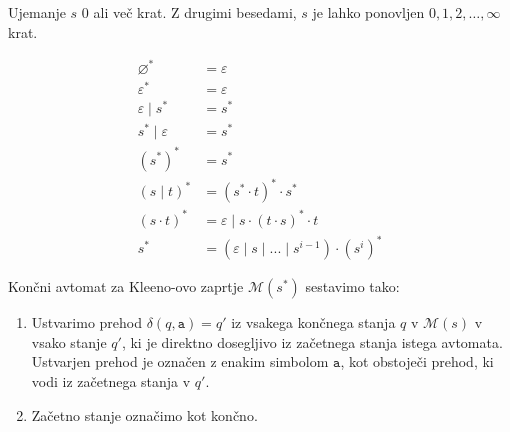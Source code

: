 \documentclass{article}
\makeatletter
\newcommand{\Empty}{\varnothing}
\newcommand{\Null}{\varepsilon}
\newcommand{\Automaton}[1]{\mathcal{M}(#1)}
\newcommand{\Char}[1]{\texttt{#1}}
\newcommand{\Seq}{\cdot}
\newcommand{\Union}{\mathrel{|}}
\newcommand{\Kleene}[1]{{#1}^\ast}
\newcommand{\Rep}[2]{{#1}^{#2}}
\DeclareRobustCommand{\Dots}{%
  \vbox{
    \baselineskip4\p@\lineskiplimit\z@
    \kern-\p@
    \hbox{.}\hbox{.}\hbox{.}
  }}
\makeatother
\begin{document}
Ujemanje $s$ 0 ali več krat.
Z drugimi besedami, $s$ je lahko ponovljen $0, 1, 2, \dots, \infty$ krat.

\begin{tcolorbox}[title={Pravila}]
  \begin{equation*}
    \begin{aligned}
      \Kleene{\Empty} &= \Null\\
      \Kleene{\Null} &= \Null\\
      \Null \Union \Kleene{s} &= \Kleene{s}\\
      \Kleene{s} \Union \Null &= \Kleene{s}\\
      \Kleene{(\Kleene{s})} &= \Kleene{s}\\
      \Kleene{(s \Union t)} &= \Kleene{(\Kleene{s} \Seq t)} \Seq \Kleene{s}\\
      \Kleene{(s \Seq t)} &= \Null \Union s \Seq \Kleene{(t \Seq s)} \Seq t\\
      \Kleene{s} &= (\Null \Union s \Union ... \Union \Rep{s}{i - 1}) \Seq \Kleene{(\Rep{s}{i})}
    \end{aligned}
  \end{equation*}
\end{tcolorbox}

Končni avtomat za Kleeno-ovo zaprtje $\Automaton{\Kleene{s}}$ sestavimo tako:
\begin{enumerate}
  \item Ustvarimo prehod $\delta(q, \Char{a}) = q'$ iz vsakega končnega stanja $q$ v $\Automaton{s}$ v vsako stanje $q'$, ki je direktno dosegljivo iz začetnega stanja istega avtomata.
    Ustvarjen prehod je označen z enakim simbolom $\Char{a}$, kot obstoječi prehod, ki vodi iz začetnega stanja v $q'$.
  \item Začetno stanje označimo kot končno.
\end{enumerate}

\begin{center}
\end{center}
\end{document}
